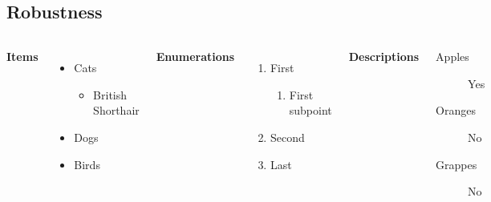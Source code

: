 \documentclass[
10pt,notheorems,compress,hyperref={pdfauthor=Maghfira Ramadhani}
]{beamer}
\begin{document}
\subsection{Robustness}
\begin{frame}
    \begin{columns}[T,onlytextwidth]
      \textbf{Items}
      \begin{itemize}
        \item Cats 
        \begin{itemize}
            \item British Shorthair
        \end{itemize}
        \item Dogs \item Birds
      \end{itemize}

      \textbf{Enumerations}
      \begin{enumerate}
        \item First 
        \begin{enumerate}
            \item First subpoint
        \end{enumerate}
        \item Second \item Last
      \end{enumerate}

      \textbf{Descriptions}
      \begin{description}
        \item[Apples] Yes \item[Oranges] No \item[Grappes] No
      \end{description}
\end{columns}
\end{frame}
\end{document}
